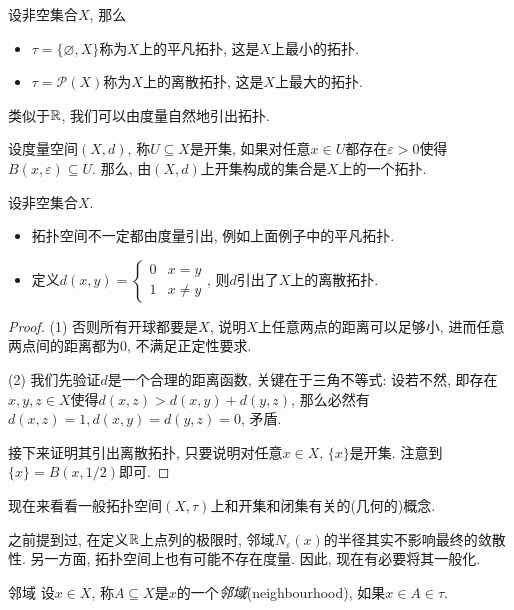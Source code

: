 \begin{example}
	设非空集合$X$, 那么
	\begin{itemize}
		\item $\tau = \{ \varnothing ,X\}$称为$X$上的平凡拓扑, 这是$X$上最小的拓扑. 
		\item $\tau = \mathcal{P}(X)$称为$X$上的离散拓扑, 这是$X$上最大的拓扑. 
	\end{itemize}
\end{example}

类似于$\mathbb{R}$, 我们可以由度量自然地引出拓扑. 

\begin{proposition}{}
	设度量空间$(X,d)$, 称$U \subseteq X$是开集, 如果对任意$x \in U$都存在$\varepsilon >0$使得$B(x,\varepsilon) \subseteq U$. 那么, 由$(X,d)$上开集构成的集合是$X$上的一个拓扑. 
\end{proposition}

\begin{example}
	设非空集合$X$. 
	\begin{itemize}
		\item 拓扑空间不一定都由度量引出, 例如上面例子中的平凡拓扑. 
		\item 定义$d(x,y)= \begin{cases}
 0 &  x=y \\
 1 &  x\neq y
\end{cases}$, 则$d$引出了$X$上的离散拓扑. 
	\end{itemize}
\end{example}
\begin{proof}
	(1) 否则所有开球都要是$X$, 说明$X$上任意两点的距离可以足够小, 进而任意两点间的距离都为$0$, 不满足正定性要求. 
	
	(2) 我们先验证$d$是一个合理的距离函数, 关键在于三角不等式: 设若不然, 即存在$x,y,z \in X$使得$d(x,z)>d(x,y)+d(y,z)$, 那么必然有$d(x,z)=1,d(x,y)=d(y,z)=0$, 矛盾. 
	
	接下来证明其引出离散拓扑, 只要说明对任意$x \in X$, $\{ x \}$是开集. 注意到$\{ x \}=B(x,1/2)$即可. 
\end{proof}

现在来看看一般拓扑空间$(X,\tau)$上和开集和闭集有关的(几何的)概念. 

之前提到过, 在定义$\mathbb{R}$上点列的极限时, 邻域$N_{\varepsilon}(x)$的半径其实不影响最终的敛散性. 另一方面, 拓扑空间上也有可能不存在度量. 因此, 现在有必要将其一般化. 

\begin{definition}{邻域}
	设$x \in X$, 称$A \subseteq X$是$x$的一个\textit{邻域}(neighbourhood), 如果$x \in A \in \tau$. 
\end{definition}

